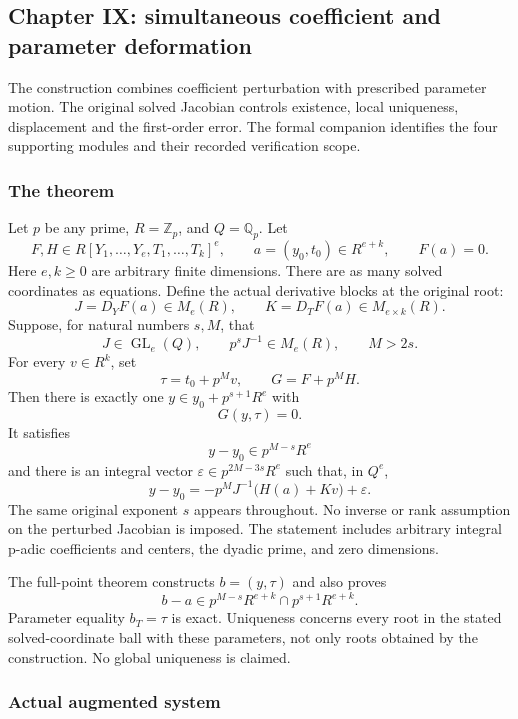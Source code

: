 \hypertarget{cont10:paper-ix-simultaneous-coefficient-and-parameter-deformation}{%
\subsection{Chapter IX: simultaneous coefficient and parameter
deformation}\label{cont10:paper-ix-simultaneous-coefficient-and-parameter-deformation}}

The construction combines coefficient perturbation with prescribed parameter
motion. The original solved Jacobian controls existence, local
uniqueness, displacement and the first-order error. The formal companion identifies the four supporting modules and their
recorded verification scope.

\hypertarget{cont10:the-theorem}{%
\subsubsection{The theorem}\label{cont10:the-theorem}}

Let \(p\) be any prime, \(R=\mathbb Z_p\), and \(Q=\mathbb Q_p\). Let \[
F,H\in R[Y_1,\ldots,Y_e,T_1,\ldots,T_k]^e,
\qquad a=(y_0,t_0)\in R^{e+k},\qquad F(a)=0.
\] Here \(e,k\ge0\) are arbitrary finite dimensions. There are as many
solved coordinates as equations. Define the actual derivative blocks at
the original root: \[
J=D_YF(a)\in M_e(R),\qquad K=D_TF(a)\in M_{e\times k}(R).
\] Suppose, for natural numbers \(s,M\), that \[
J\in\operatorname{GL}_e(Q),\qquad p^sJ^{-1}\in M_e(R),\qquad M>2s.
\] For every \(v\in R^k\), set \[
\tau=t_0+p^Mv,\qquad G=F+p^MH.
\] Then there is exactly one \(y\in y_0+p^{s+1}R^e\) with \[
G(y,\tau)=0.
\] It satisfies \[
y-y_0\in p^{M-s}R^e
\] and there is an integral vector \(\varepsilon\in p^{2M-3s}R^e\) such
that, in \(Q^e\), \[
\boxed{\displaystyle
 y-y_0=-p^MJ^{-1}\bigl(H(a)+Kv\bigr)+\varepsilon.
}
\] The same original exponent \(s\) appears throughout. No inverse or
rank assumption on the perturbed Jacobian is imposed. The statement
includes arbitrary integral p-adic coefficients and centers, the dyadic
prime, and zero dimensions.

The full-point theorem constructs \(b=(y,\tau)\) and also proves \[
b-a\in p^{M-s}R^{e+k}\cap p^{s+1}R^{e+k}.
\] Parameter equality \(b_T=\tau\) is exact. Uniqueness concerns every
root in the stated solved-coordinate ball with these parameters, not
only roots obtained by the construction. No global uniqueness is
claimed.

\hypertarget{cont10:actual-augmented-system}{%
\subsubsection{Actual augmented system}\label{cont10:actual-augmented-system}}

